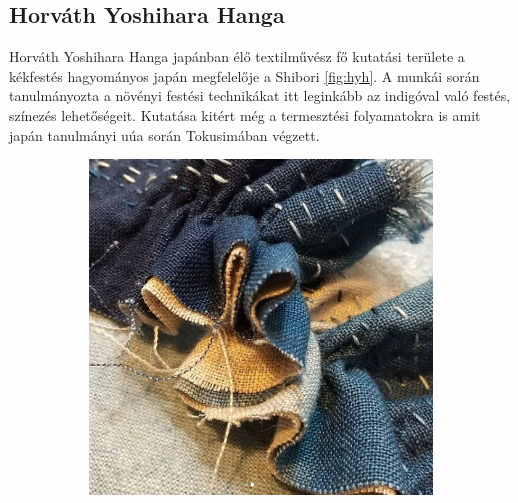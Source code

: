 \documentclass[fontsize=12pt, appendixprefix=true]{scrreprt}
\begin{document}
\subsection{Horváth Yoshihara Hanga} 
Horváth Yoshihara Hanga japánban élő textilművész fő kutatási területe \cite{hanga2010} a kékfestés hagyományos japán megfelelője a Shibori \ref{fig:hyh}.
A munkái során tanulmányozta a növényi festési technikákat itt leginkább az indigóval való festés, színezés lehetőségeit. Kutatása kitért még a termesztési folyamatokra is amit japán tanulmányi uúa során Tokusimában végzett.

\begin{figure}[h!]
	\centering
	\begin{subfigure}[b]{0.3\linewidth}
	  \includegraphics[width=\linewidth]{img/hh_01.png}
	  \caption{}
	\end{subfigure}
	\begin{subfigure}[b]{0.3\linewidth}

\end{subfigure}
\end{figure}
\end{document}
